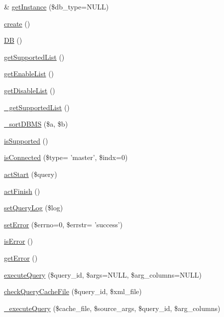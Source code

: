 \begin{DoxyCompactItemize}
\item 
\& \hyperlink{classDB_a16f4a668b6429b4b9af5132cbf885213}{get\+Instance} (\$db\+\_\+type=N\+U\+L\+L)
\item 
\hyperlink{classDB_aad22e845daa75ae9ca9b97f7e3a89749}{create} ()
\item 
\hyperlink{classDB_a29a603c52c10831cddee82518417f992}{D\+B} ()
\item 
\hyperlink{classDB_a82226ac3fc6365c0771b13e389d216cf}{get\+Supported\+List} ()
\item 
\hyperlink{classDB_a0031322267656e8f6bc7f811ca21198b}{get\+Enable\+List} ()
\item 
\hyperlink{classDB_a65508ca8b2bb4ebf6dbb570caf9c8e40}{get\+Disable\+List} ()
\item 
\hyperlink{classDB_a7b0d1af98d9f53968631ca789d6d755c}{\+\_\+get\+Supported\+List} ()
\item 
\hyperlink{classDB_ab0a6d97fa16de74b4d991c9a4d633718}{\+\_\+sort\+D\+B\+M\+S} (\$a, \$b)
\item 
\hyperlink{classDB_a7517481bc9d24ad659f8d347688e481b}{is\+Supported} ()
\item 
\hyperlink{classDB_a217cc2096613d1758a9851f1dd990d71}{is\+Connected} (\$type= 'master', \$indx=0)
\item 
\hyperlink{classDB_a51a1ba94763a8211495eac18d74c80bb}{act\+Start} (\$query)
\item 
\hyperlink{classDB_a79cad647912ef780e967819e6346a742}{act\+Finish} ()
\item 
\hyperlink{classDB_a0adb7f453d6e8ed2e491d6708be7f9ec}{set\+Query\+Log} (\$log)
\item 
\hyperlink{classDB_af2584546ee78d07a40cc16493f8797cc}{set\+Error} (\$errno=0, \$errstr= 'success')
\item 
\hyperlink{classDB_ab1433763c6378f1085606424a1bfe27c}{is\+Error} ()
\item 
\hyperlink{classDB_a3956fe8725f824d8c0a4f3cba449d6df}{get\+Error} ()
\item 
\hyperlink{classDB_a2ac8db06615a3ded603d42c731a67ee3}{execute\+Query} (\$query\+\_\+id, \$args=N\+U\+L\+L, \$arg\+\_\+columns=N\+U\+L\+L)
\item 
\hyperlink{classDB_a0bbeb84cee13c54916b7f9aac6db4791}{check\+Query\+Cache\+File} (\$query\+\_\+id, \$xml\+\_\+file)
\item 
\hyperlink{classDB_ae3febd3b468fd75f9606f247489d5512}{\+\_\+execute\+Query} (\$cache\+\_\+file, \$source\+\_\+args, \$query\+\_\+id, \$arg\+\_\+columns)

\end{DoxyCompactItemize}
